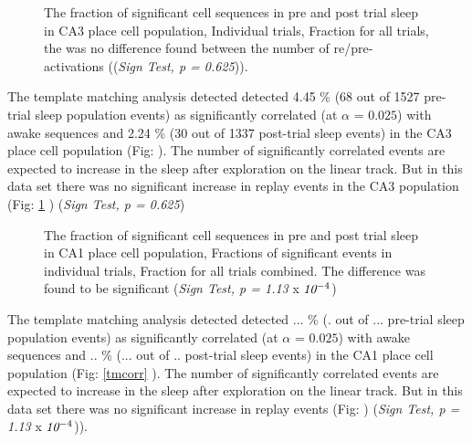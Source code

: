 \begin{figure}[H!]
\centering
{}
\caption[Pre and post trial sleep events CA3]{The fraction of significant cell sequences in pre and post trial sleep in CA3 place cell population,  Individual trials,  Fraction for all trials, the was no difference found between the number of re/pre-activations ((\emph{Sign Test, p = 0.625})).}
\label{fig:pre2postca3}
\end{figure}
The template matching analysis detected detected 4.45 \% (68 out of 1527 pre-trial sleep population events) as significantly correlated (at $ \alpha $ = $0.025$) with awake sequences and 2.24 \% (30 out of 1337 post-trial sleep events) in the CA3 place cell population (Fig:  ). The number of significantly correlated events are expected to increase in the sleep after exploration on the linear track. But in this data set there was no significant increase in replay events in the CA3 population (Fig: \ref{fig:pre2postca3} ) (\emph{Sign Test, p = 0.625})

\begin{figure}[H!]
\centering
{}
\caption[Pre and post trial sleep events CA1]{The fraction of significant cell sequences in pre and post trial sleep in CA1 place cell population,  Fractions of significant events in individual trials,  Fraction for all trials combined. The difference was found to be significant (\emph{Sign Test, p = 1.13} x $\emph{10}^{-4}$)}
\label{fig:pre2postca1}
\end{figure}
The template matching analysis detected detected ... \% (. out of ... pre-trial sleep population events) as significantly correlated (at $ \alpha $ = $0.025$) with awake sequences and .. \% (... out of .. post-trial sleep events) in the CA1 place cell population (Fig: \ref{tmcorr} ). The number of significantly correlated events are expected to increase in the sleep after exploration on the linear track. But in this data set there was no significant increase in replay events (Fig: ) (\emph{Sign Test, p =  1.13} x $\emph{10}^{-4}$)).
